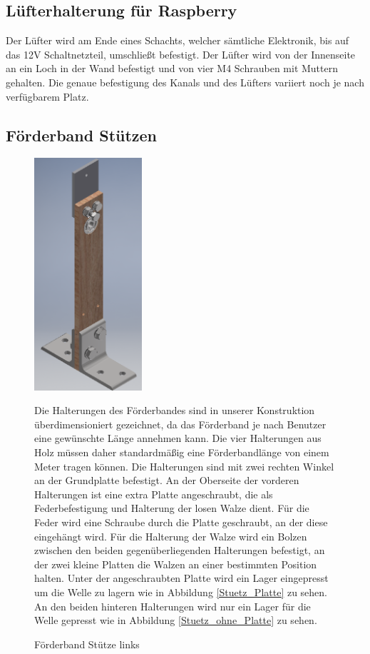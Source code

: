 \subsection{Lüfterhalterung für Raspberry}
Der Lüfter wird am Ende eines Schachts, welcher sämtliche Elektronik, bis auf das 12V Schaltnetzteil, umschließt befestigt. Der Lüfter wird von der Innenseite an ein Loch in der Wand befestigt und von vier M4 Schrauben mit Muttern gehalten. Die genaue befestigung des Kanals und des Lüfters variiert noch je nach verfügbarem Platz. \\
\subsection{Förderband Stützen}

\begin{figure}[H]
\begin{minipage}[t]{6cm}
\vspace{0pt}
\centering
\includegraphics[width=4cm]{Bilder/Inventor/Foerderband_Stuetze}
\caption{Förderband Stütze links}
\label{Foerd_stue}
\end{minipage}
\hfill
\begin{minipage}[t]{11cm}
\vspace{0pt}
Die Halterungen des Förderbandes sind in unserer Konstruktion überdimensioniert gezeichnet, da das Förderband je nach Benutzer eine gewünschte Länge annehmen kann. Die vier Halterungen aus Holz müssen daher standardmäßig eine Förderbandlänge von einem Meter tragen können. Die Halterungen sind mit zwei rechten Winkel an der Grundplatte befestigt. An der Oberseite der vorderen Halterungen ist eine extra Platte angeschraubt, die als Federbefestigung und Halterung der losen Walze dient. Für die Feder wird eine Schraube durch die Platte geschraubt, an der diese eingehängt wird. Für die Halterung der Walze wird ein Bolzen zwischen den beiden gegenüberliegenden Halterungen befestigt, an der zwei kleine Platten die Walzen an einer bestimmten Position halten. Unter der angeschraubten Platte wird ein Lager eingepresst um die Welle zu lagern wie in Abbildung \ref{Stuetz_Platte} zu sehen.  An den beiden hinteren Halterungen wird nur ein Lager für die Welle gepresst wie in Abbildung \ref{Stuetz_ohne_Platte} zu sehen.
\end{minipage}
\end{figure}
